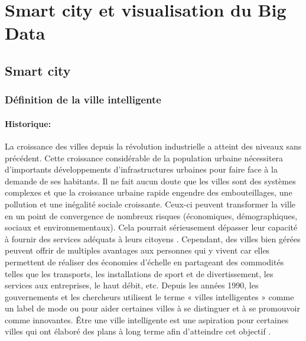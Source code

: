 \documentclass[french, a4paper, 12pt]{report}
\begin{document}
\chapter{Smart city  et  visualisation du Big Data}
\section{Smart city}
\subsection{Définition de la ville intelligente}
\subsubsection{Historique:}
La croissance des villes depuis la révolution industrielle a atteint des niveaux sans précédent. 
Cette croissance considérable de la population urbaine nécessitera d’importants développements d’infrastructures urbaines pour faire face à la demande de ses habitants. Il ne fait aucun doute que les villes sont des systèmes complexes et que la croissance urbaine rapide engendre des embouteillages, une pollution et une inégalité sociale croissante. Ceux-ci peuvent transformer la ville en un point de convergence de nombreux risques (économiques, démographiques, sociaux et environnementaux). Cela pourrait sérieusement dépasser leur capacité à fournir des services adéquats à leurs citoyens \cite{1}. Cependant, des villes bien gérées peuvent offrir de multiples avantages aux personnes qui y vivent car elles permettent de réaliser des économies d’échelle en partageant des commodités telles que les transports, les installations de sport et de divertissement, les services aux entreprises, le haut débit, etc.
Depuis les années 1990, les gouvernements et les chercheurs utilisent le terme « villes intelligentes » comme un label de mode ou pour aider certaines villes à se distinguer et à se promouvoir comme innovantes. Être une ville intelligente est une aspiration pour certaines villes qui ont élaboré des plans à long terme afin d’atteindre cet objectif \cite{2}.
\end{document}
